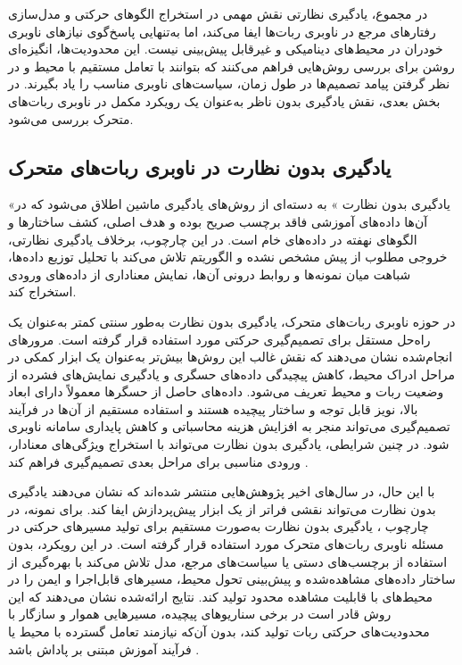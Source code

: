 در مجموع، یادگیری نظارتی نقش مهمی در استخراج الگوهای حرکتی و مدل‌سازی رفتارهای مرجع در ناوبری ربات‌ها ایفا می‌کند، اما به‌تنهایی پاسخ‌گوی نیازهای ناوبری خودران در محیط‌های دینامیکی و غیرقابل پیش‌بینی نیست. این محدودیت‌ها، انگیزه‌ای روشن برای بررسی روش‌هایی فراهم می‌کنند که بتوانند با تعامل مستقیم با محیط و در نظر گرفتن پیامد تصمیم‌ها در طول زمان، سیاست‌های ناوبری مناسب را یاد بگیرند. در بخش بعدی، نقش یادگیری بدون ناظر به‌عنوان یک رویکرد مکمل در ناوبری ربات‌های متحرک بررسی می‌شود.

\subsection{یادگیری بدون نظارت در ناوبری ربات‌های متحرک}

«یادگیری بدون نظارت%
» %
به دسته‌ای از روش‌های یادگیری ماشین اطلاق می‌شود که در آن‌ها داده‌های آموزشی فاقد برچسب صریح بوده و هدف اصلی، کشف ساختارها و الگوهای نهفته در داده‌های خام است. در این چارچوب، برخلاف یادگیری نظارتی، خروجی مطلوب از پیش مشخص نشده و الگوریتم تلاش می‌کند با تحلیل توزیع داده‌ها، شباهت میان نمونه‌ها و روابط درونی آن‌ها، نمایش معناداری از داده‌های ورودی استخراج کند.

در حوزه ناوبری ربات‌های متحرک، یادگیری بدون نظارت به‌طور سنتی کمتر به‌عنوان یک راه‌حل مستقل برای تصمیم‌گیری حرکتی مورد استفاده قرار گرفته است. مرورهای انجام‌شده نشان می‌دهند که نقش غالب این روش‌ها بیش‌تر به‌عنوان یک ابزار کمکی در مراحل ادراک محیط، کاهش پیچیدگی داده‌های حسگری و یادگیری نمایش‌های فشرده از وضعیت ربات و محیط تعریف می‌شود. داده‌های حاصل از حسگرها معمولاً دارای ابعاد بالا، نویز قابل توجه و ساختار پیچیده هستند و استفاده مستقیم از آن‌ها در فرآیند تصمیم‌گیری می‌تواند منجر به افزایش هزینه محاسباتی و کاهش پایداری سامانه ناوبری شود. در چنین شرایطی، یادگیری بدون نظارت می‌تواند با استخراج ویژگی‌های معنادار، ورودی مناسبی برای مراحل بعدی تصمیم‌گیری فراهم کند%
\cite{Zhu2021,s25113394}. 

با این حال، در سال‌های اخیر پژوهش‌هایی منتشر شده‌اند که نشان می‌دهند یادگیری بدون نظارت می‌تواند نقشی فراتر از یک ابزار پیش‌پردازش ایفا کند. برای نمونه، در چارچوب %
 ، یادگیری بدون نظارت به‌صورت مستقیم برای تولید مسیرهای حرکتی در مسئله ناوبری ربات‌های متحرک مورد استفاده قرار گرفته است. در این رویکرد، بدون استفاده از برچسب‌های دستی یا سیاست‌های مرجع، مدل تلاش می‌کند با بهره‌گیری از ساختار داده‌های مشاهده‌شده و پیش‌بینی تحول محیط، مسیرهای قابل‌اجرا و ایمن را در محیط‌های با قابلیت مشاهده محدود تولید کند. نتایج ارائه‌شده نشان می‌دهند که این روش قادر است در برخی سناریوهای پیچیده، مسیرهایی هموار و سازگار با محدودیت‌های حرکتی ربات تولید کند، بدون آن‌که نیازمند تعامل گسترده با محیط یا فرآیند آموزش مبتنی بر پاداش باشد%
\cite{Luo2025UP3}.

